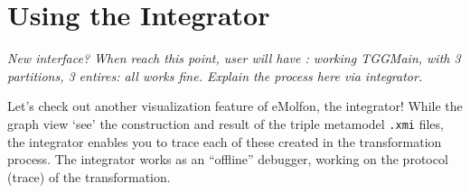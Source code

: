 \newpage
\section{Using the Integrator}
\genHeader
\label{sec:app_integrator}

\emph{New interface? When reach this point, user will have : working TGGMain, with 3 partitions, 3 entires: all works fine. Explain the process
here via integrator.}

Let's check out another visualization feature of eMolfon, the integrator! While the graph view `see' the construction and result of the triple
metamodel \texttt{.xmi} files, the integrator enables you to trace each of these created in the transformation process. The integrator works as an ``offline''
debugger, working on the protocol (trace) of the transformation.

